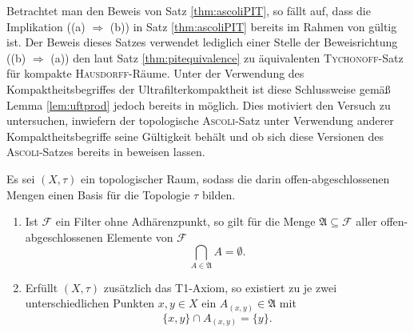 Betrachtet man den Beweis von Satz \ref{thm:ascoliPIT}, so fällt auf, dass die Implikation ((a) $\Rightarrow$ (b)) in Satz \ref{thm:ascoliPIT} bereits im Rahmen von \ZF gültig ist.
Der Beweis dieses Satzes verwendet lediglich einer Stelle der Beweisrichtung ((b) $\Rightarrow$ (a)) den laut Satz \ref{thm:pitequivalence} zu \PIT äquivalenten \textsc{Tychonoff}\hyp{}Satz für kompakte \textsc{Hausdorff}\hyp{}Räume.
Unter der Verwendung des Kompaktheitsbegriffes der Ultrafilterkompaktheit ist diese Schlussweise gemäß Lemma \ref{lem:uftprod} jedoch bereits in \ZF möglich.  
Dies motiviert den Versuch zu untersuchen, inwiefern der topologische \textsc{Ascoli}\hyp{}Satz unter Verwendung anderer Kompaktheitsbegriffe seine Gültigkeit behält und ob sich diese Versionen des \textsc{Ascoli}\hyp{}Satzes bereits in \ZF beweisen lassen.

\begin{lem}
  \label{lem:filterclusterpoint}
  Es sei $(X,\tau)$ ein topologischer Raum, sodass die darin offen\hyp{}abgeschlossenen Mengen einen Basis für die Topologie $\tau$ bilden.
  \begin{enumerate}[(1)]
    \item Ist $\mathcal{F}$ ein Filter ohne Adhärenzpunkt, so gilt für die Menge $\mathfrak{A} \subseteq \mathcal{F}$ aller offen\hyp{}abgeschlossenen Elemente von $\mathcal{F}$
     \begin{displaymath}
       \bigcap_{A \in \mathfrak{A}} A = \emptyset.
     \end{displaymath}
   \item Erfüllt $(X,\tau)$ zusätzlich das T1\hyp{}Axiom, so existiert zu je zwei unterschiedlichen Punkten $x,y \in X$ ein $A_{(x,y)} \in \mathfrak{A}$ mit 
     \begin{displaymath}
       \{x,y\} \cap A_{(x,y)} = \{y\}.
     \end{displaymath}
  \end{enumerate}
\end{lem}

